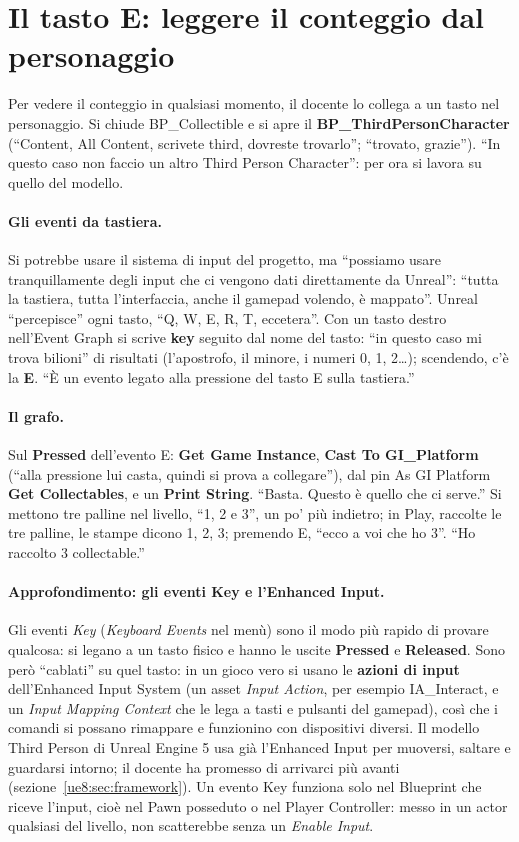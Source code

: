 \section{Il tasto E: leggere il conteggio dal personaggio}
\label{ue8:sec:tastoe}

Per vedere il conteggio in qualsiasi momento, il docente lo collega a un tasto nel
personaggio. Si chiude BP\_Collectible e si apre il \textbf{BP\_ThirdPersonCharacter}
(``Content, All Content, scrivete third, dovreste trovarlo''; ``trovato, grazie''). ``In
questo caso non faccio un altro Third Person Character'': per ora si lavora su quello del
modello.

\paragraph{Gli eventi da tastiera.} Si potrebbe usare il sistema di input del progetto, ma
``possiamo usare tranquillamente degli input che ci vengono dati direttamente da Unreal'':
``tutta la tastiera, tutta l'interfaccia, anche il gamepad volendo, è mappato''. Unreal
``percepisce'' ogni tasto, ``Q, W, E, R, T, eccetera''. Con un tasto destro nell'Event
Graph si scrive \textbf{key} seguito dal nome del tasto: ``in questo caso mi trova
bilioni'' di risultati (l'apostrofo, il minore, i numeri 0, 1, 2\ldots); scendendo,
c'è la \textbf{E}. ``È un evento legato alla pressione del tasto E sulla tastiera.''

\paragraph{Il grafo.} Sul \textbf{Pressed} dell'evento E: \textbf{Get Game Instance},
\textbf{Cast To GI\_Platform} (``alla pressione lui casta, quindi si prova a
collegare''), dal pin As GI Platform \textbf{Get Collectables}, e un \textbf{Print
String}. ``Basta. Questo è quello che ci serve.'' Si mettono tre palline nel livello,
``1, 2 e 3'', un po' più indietro; in Play, raccolte le tre palline, le stampe dicono 1,
2, 3; premendo E, ``ecco a voi che ho 3''. ``Ho raccolto 3 collectable.''

\paragraph{Approfondimento: gli eventi Key e l'Enhanced Input.} Gli eventi \emph{Key}
(\emph{Keyboard Events} nel menù) sono il modo più rapido di provare qualcosa: si
legano a un tasto fisico e hanno le uscite \textbf{Pressed} e \textbf{Released}. Sono
però ``cablati'' su quel tasto: in un gioco vero si usano le \textbf{azioni di input}
dell'Enhanced Input System (un asset \emph{Input Action}, per esempio IA\_Interact, e un
\emph{Input Mapping Context} che le lega a tasti e pulsanti del gamepad), così che i
comandi si possano rimappare e funzionino con dispositivi diversi. Il modello Third
Person di Unreal Engine 5 usa già l'Enhanced Input per muoversi, saltare e guardarsi
intorno; il docente ha promesso di arrivarci più avanti (sezione~\ref{ue8:sec:framework}).
Un evento Key funziona solo nel Blueprint che riceve l'input, cioè nel Pawn posseduto o
nel Player Controller: messo in un actor qualsiasi del livello, non scatterebbe senza un
\emph{Enable Input}.

